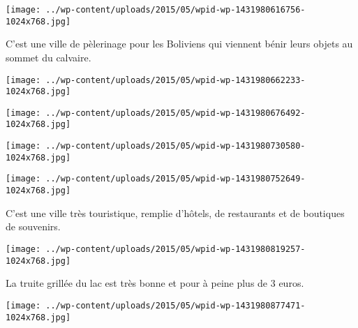 

 

\begin{center} \texttt{[image: ../wp-content/uploads/2015/05/wpid-wp-1431980616756-1024x768.jpg]} \end{center}

 

 C'est une ville de pèlerinage pour les Boliviens qui viennent bénir leurs objets au sommet du calvaire. 

 

\begin{center} \texttt{[image: ../wp-content/uploads/2015/05/wpid-wp-1431980662233-1024x768.jpg]} \end{center}

 

 

\begin{center} \texttt{[image: ../wp-content/uploads/2015/05/wpid-wp-1431980676492-1024x768.jpg]} \end{center}

 

 

\begin{center} \texttt{[image: ../wp-content/uploads/2015/05/wpid-wp-1431980730580-1024x768.jpg]} \end{center}

 

 

\begin{center} \texttt{[image: ../wp-content/uploads/2015/05/wpid-wp-1431980752649-1024x768.jpg]} \end{center}

 

 C'est une ville très touristique, remplie d'hôtels, de restaurants et de boutiques de souvenirs. 

 

\begin{center} \texttt{[image: ../wp-content/uploads/2015/05/wpid-wp-1431980819257-1024x768.jpg]} \end{center}

 

 La truite grillée du lac est très bonne et pour à peine plus de 3 euros. 

 

\begin{center} \texttt{[image: ../wp-content/uploads/2015/05/wpid-wp-1431980877471-1024x768.jpg]} \end{center}

